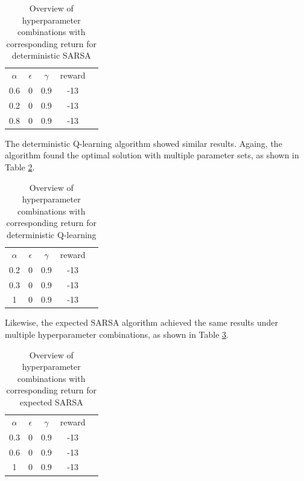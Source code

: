 \begin{table}[H]
\begin{centering}
	\begin{tabular}{ccccc}
	$\alpha$ & $\epsilon$ & $\gamma$ & reward &  \\
	0.6   & 0   & 0.9   & -13     &  \\
	0.2   & 0   & 0.9   & -13     &  \\
	0.8   & 0   & 0.9   & -13     & 
	\end{tabular}
    \caption{Overview of hyperparameter combinations with corresponding return for deterministic SARSA}
    \label{table:deterministic_sarsa_results}
\end{centering}
\end{table}

The deterministic Q-learning algorithm showed similar results. Againg, the algorithm found the optimal solution with multiple parameter sets, as shown in Table \ref{table:deterministic_Q_results}.

\begin{table}[H]
\begin{centering}
	\begin{tabular}{ccccc}
	$\alpha$ & $\epsilon$ & $\gamma$ & reward &  \\
	0.2   & 0   & 0.9   & -13     &  \\
	0.3   & 0   & 0.9   & -13     &  \\
	1     & 0   & 0.9   & -13     & 
	\end{tabular}
    \caption{Overview of hyperparameter combinations with corresponding return for deterministic Q-learning}
    \label{table:deterministic_Q_results}

\end{centering}
\end{table}

Likewise, the expected SARSA algorithm achieved the same results under multiple hyperparameter combinations, as shown in Table \ref{table:expected_sarsa_results}.


\begin{table}[H]
\begin{centering}
	\begin{tabular}{ccccc}
	$\alpha$ & $\epsilon$ & $\gamma$ & reward &  \\
	0.3   & 0   & 0.9   & -13     &  \\
	0.6   & 0   & 0.9   & -13     &  \\
	1     & 0   & 0.9   & -13     & 
	\end{tabular}
    \caption{Overview of hyperparameter combinations with corresponding return for expected SARSA}
    \label{table:expected_sarsa_results}
\end{centering}
\end{table}





